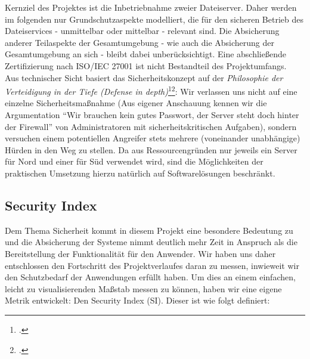 Kernziel des Projektes ist die Inbetriebnahme zweier Dateiserver. Daher werden im folgenden nur Grundschutzaspekte modelliert, die für den sicheren Betrieb des Dateiservices - unmittelbar oder mittelbar - relevant sind. Die Absicherung anderer Teilaspekte der Gesamtumgebung - wie auch die Absicherung der Gesamtumgebung an sich - bleibt dabei unberücksichtigt. Eine abschließende Zertifizierung nach ISO/IEC 27001 ist nicht Bestandteil des Projektumfangs.\\

Aus technischer Sicht basiert das Sicherheitskonzept auf der \emph{Philosophie der Verteidigung in der Tiefe (Defense in depth)}\footcite{wikiDiD}\footcite{kuipers2006control}: Wir verlassen uns nicht auf eine einzelne Sicherheitsmaßnahme (Aus eigener Anschauung kennen wir die Argumentation "`Wir brauchen kein gutes Passwort, der Server steht doch hinter der Firewall"' von Administratoren mit sicherheitskritischen Aufgaben), sondern versuchen einem potentiellen Angreifer stets mehrere (voneinander unabhängige) Hürden in den Weg zu stellen. Da aus Ressourcengründen nur jeweils ein Server für Nord und einer für Süd verwendet wird, sind die Möglichkeiten der praktischen Umsetzung hierzu natürlich auf Softwarelösungen beschränkt.

\subsection{Security Index}
\label{subsec:si}
Dem Thema Sicherheit kommt in diesem Projekt eine besondere Bedeutung zu und die Absicherung der Systeme nimmt deutlich mehr Zeit in Anspruch als die Bereitstellung der Funktionalität für den Anwender. Wir haben uns daher entschlossen den Fortschritt des Projektverlaufes daran zu messen, inwieweit wir den Schutzbedarf der Anwendungen erfüllt haben. Um dies an einem einfachen, leicht zu visualisierenden Maßstab messen zu können, haben wir eine eigene Metrik entwickelt: Den Security Index (SI). Dieser ist wie folgt definiert:\\

